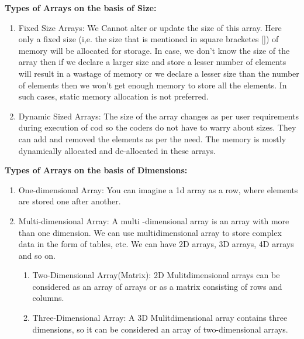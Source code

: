 \textbf{Types of Arrays on the basis of Size:}
\begin{enumerate}
    \item Fixed Size Arrays:
        We Cannot alter or update the size of this array. Here only a
        fixed size (i,e. the size that is mentioned in square bracketes
        []) of memory will be allocated for storage. In case, we don't
        know the size of the array then if we declare a larger size and
        store a lesser number of elements will result in a wastage of
        memory or we declare a lesser size than the number of elements
        then we won't get enough memory to store all the elements. In
        such cases, static memory allocation is not preferred.
    \item Dynamic Sized Arrays:
        The size of the array changes as per user requirements during
        execution of cod so the coders do not have to warry about sizes.
        They can add and removed the elements as per the need. The
        memory is mostly dynamically allocated and de-allocated in these
        arrays.
\end{enumerate}

\textbf{Types of Arrays on the basis of Dimensions:}
\begin{enumerate}
    \item One-dimensional Array: You can imagine a 1d array as a row,
        where elements are stored one after another.
    \item Multi-dimensional Array: A multi -dimensional array is an
        array with more than one dimension. We can use multidimensional
        array to store complex data in the form of tables, etc. We can
        have 2D arrays, 3D arrays, 4D arrays and so on.
        \begin{enumerate}
            \item Two-Dimensional Array(Matrix): 2D Mulitdimensional
                arrays can be considered as an array of arrays or as a
                matrix consisting of rows and columns.
            \item Three-Dimensional Array: A 3D Mulitdimensional array
                contains three dimensions, so it can be considered an
                array of two-dimensional arrays.
        \end{enumerate}
\end{enumerate}
